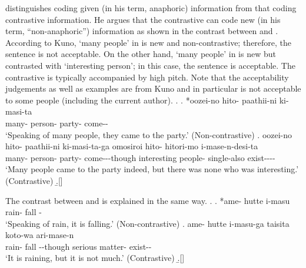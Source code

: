  distinguishes  coding given (in his term, anaphoric) information
from that coding contrastive information.
He argues that the contrastive  can code new (in his term, ``non-anaphoric'') information
as shown in the contrast between \Next[a] and \Next[b].
According to Kuno,
 `many people' in \Next[a] is new and non-contrastive;
therefore, the sentence is not acceptable.
On the other hand,  `many people' in \Next[b] is new but contrasted with  `interesting person';
in this case, the sentence is acceptable.
The contrastive  is typically accompanied by high pitch.
Note that the acceptability judgements as well as examples are from Kuno and
in particular \Next[b] is not acceptable to some people (including the current author).
%
\ex.
 \ag. *oozei-no hito- paathii-ni ki-masi-ta \\
       many- person- party- come-- \\
       `Speaking of many people, they came to the party.'
       \hfill{(Non-contrastive)}
 \bg. oozei-no hito- paathii-ni ki-masi-ta-ga omosiroi hito- hitori-mo i-mase-n-desi-ta \\
       many- person- party- come---though interesting people- single-also exist---- \\
       `Many people came to the party indeed, but there was none who was interesting.'
       \hfill{(Contrastive)}
 \b.[] \hfill{\cite[47]{kuno73}}

The contrast between \Next[a] and \Next[b] is explained in the same way.
\ex.
 \ag. *ame- hutte i-masu \\
       rain- fall - \\
       `Speaking of rain, it is falling.'
       \hfill{(Non-contrastive)}
 \bg. ame- hutte i-masu-ga taisita koto-wa ari-mase-n \\
       rain- fall --though serious matter- exist-- \\
       `It is raining, but it is not much.'
       \hfill{(Contrastive)}
 \b.[] \hfill{\cite[46]{kuno73}}
%

